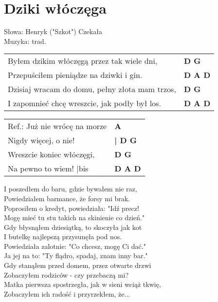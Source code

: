 \section{Dziki włóczęga}

Słowa: Henryk ("Szkot") Czekała \\
Muzyka:  trad.

\vspace{2em}
\begin{tabular}{@{}p{9cm}@{}l@{}}
Byłem dzikim włóczęgą przez tak wiele dni, & \bfseries  D G \\
Przepuściłem pieniądze na dziwki i gin. & \bfseries  D A D \\
Dzisiaj wracam do domu, pełny złota mam trzos, & \bfseries  D G \\
I zapomnieć chcę wreszcie, jak podły był los. & \bfseries  D A D \\
\end{tabular}

\vspace{1em}
\begin{tabular}{@{}p{9cm}@{}l@{}}
Ref.: Już nie wrócę na morze & \bfseries  A \\
Nigdy więcej, o nie! & \bfseries | D G \\
Wreszcie koniec włóczęgi, & \bfseries  D G \\
Na pewno to wiem!          |bis  & \bfseries  D A D \\
\end{tabular}

\vspace{1em}
I poszedłem do baru, gdzie bywałem nie raz, \\
Powiedziałem barmance, że forsy mi brak. \\
Poprosiłem o kredyt, powiedziała: "Idź precz! \\
Mogę mieć tu stu takich na skinienie co dzień." \\

Gdy błysnąłem dziesiątką, to skoczyła jak kot \\
I butelkę najlepszą przysunęła pod nos. \\
Powiedziała zalotnie: "Co chcesz, mogę Ci dać." \\
Ja jej na to: "Ty flądro, spadaj, znam inny bar." \\

Gdy stanąłem przed domem, przez otwarte drzwi \\
Zobaczyłem rodziców - czy przebaczą mi? \\
Matka pierwsza spostrzegła, jak w sieni wciąż tkwię, \\
Zobaczyłem ich radość i przyrzekłem, że...  \\